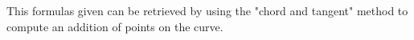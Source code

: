\documentclass[journal]{IEEEtran}
\begin{document}
This formulas given can be retrieved by using the "chord and tangent" method to compute an addition of points on the curve.

\ifCLASSOPTIONcaptionsoff
  \newpage
\fi






%
%
%


% 


\end{document}
